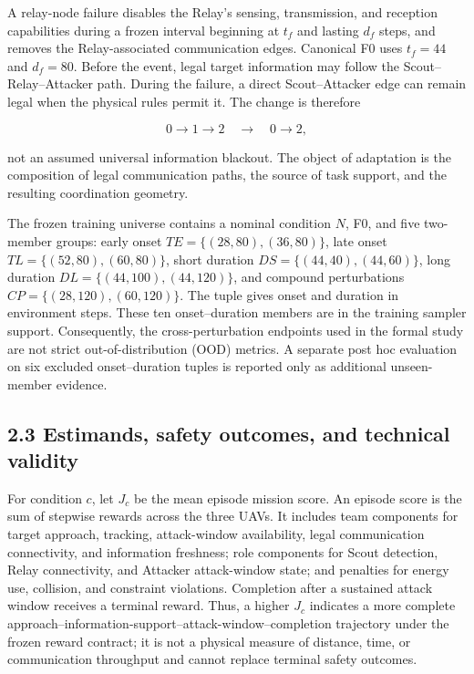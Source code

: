 A relay-node failure disables the Relay's sensing, transmission, and reception capabilities during a frozen interval beginning at \(t_f\) and lasting \(d_f\) steps, and removes the Relay-associated communication edges. Canonical F0 uses \(t_f=44\) and \(d_f=80\). Before the event, legal target information may follow the Scout--Relay--Attacker path. During the failure, a direct Scout--Attacker edge can remain legal when the physical rules permit it. The change is therefore

\[
0\rightarrow1\rightarrow2\quad\longrightarrow\quad0\rightarrow2,
\]

not an assumed universal information blackout. The object of adaptation is the composition of legal communication paths, the source of task support, and the resulting coordination geometry.

The frozen training universe contains a nominal condition \(N\), F0, and five two-member groups: early onset \(TE=\{(28,80),(36,80)\}\), late onset \(TL=\{(52,80),(60,80)\}\), short duration \(DS=\{(44,40),(44,60)\}\), long duration \(DL=\{(44,100),(44,120)\}\), and compound perturbations \(CP=\{(28,120),(60,120)\}\). The tuple gives onset and duration in environment steps. These ten onset--duration members are in the training sampler support. Consequently, the cross-perturbation endpoints used in the formal study are not strict out-of-distribution (OOD) metrics. A separate post hoc evaluation on six excluded onset--duration tuples is reported only as additional unseen-member evidence.

\subsection{2.3 Estimands, safety outcomes, and technical validity}

For condition \(c\), let \(J_c\) be the mean episode mission score. An episode score is the sum of stepwise rewards across the three UAVs. It includes team components for target approach, tracking, attack-window availability, legal communication connectivity, and information freshness; role components for Scout detection, Relay connectivity, and Attacker attack-window state; and penalties for energy use, collision, and constraint violations. Completion after a sustained attack window receives a terminal reward. Thus, a higher \(J_c\) indicates a more complete approach--information-support--attack-window--completion trajectory under the frozen reward contract; it is not a physical measure of distance, time, or communication throughput and cannot replace terminal safety outcomes.

